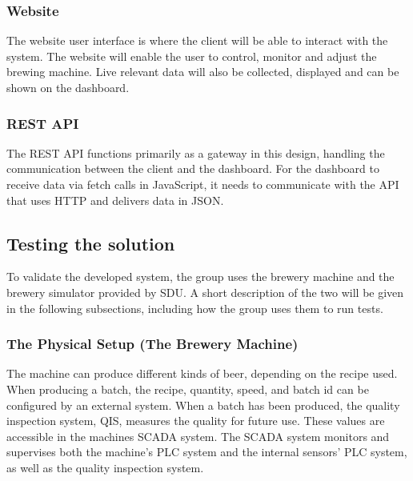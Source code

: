 \subsubsection{Website}
The website user interface is where the client will be able to interact with
the system. The website will enable the user to control, monitor and adjust
the brewing machine. Live relevant data will also be collected, displayed and
can be shown on the dashboard.


\subsubsection{REST API}
The REST API functions primarily as a gateway in this design, handling the
communication between the client and the dashboard. For the
dashboard to receive data via fetch calls in JavaScript, it needs to communicate 
with the API that uses HTTP and delivers data in JSON.


\subsection{Testing the solution}
To validate the developed system, the group uses the brewery machine and the
brewery simulator provided by SDU. A short description of the two will be given
in the following subsections, including how the group uses them to run tests.

\subsubsection{The Physical Setup (The Brewery Machine)}
The machine can produce different kinds of beer, depending on the recipe used.
When producing a batch, the recipe, quantity, speed, and batch id can be
configured by an external system. When a batch has been produced, the quality
inspection system, QIS, measures the quality for future use. These values are
accessible in the machines SCADA system. The SCADA system monitors and
supervises both the machine's PLC system and the internal sensors' PLC system,
as well as the quality inspection system.\\

